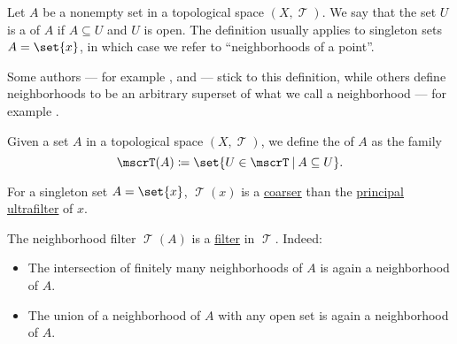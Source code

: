 \begin{definition}\label{def:topological_neighborhood}
  Let \( A \) be a nonempty set in a topological space \( (X, \mscrT) \). We say that the set \( U \) is a  of \( A \) if \( A \subseteq U \) and \( U \) is open. The definition usually applies to singleton sets \( A = \set{ x } \), in which case we refer to \enquote{neighborhoods of a point}.
\end{definition}
\begin{comments}
  \item Some authors --- for example ,  and  --- stick to this definition, while others define neighborhoods to be an arbitrary superset of what we call a neighborhood --- for example .
\end{comments}

\begin{definition}\label{def:neighborhood_filter}
  Given a set \( A \) in a topological space \( (X, \mscrT) \), we define the  of \( A \) as the family
  \begin{equation*}
    \mscrT(A) \coloneqq \set{ U \in \mscrT \given A \subseteq U }.
  \end{equation*}
\end{definition}
\begin{comments}
  \item For a singleton set \( A = \set{ x } \), \( \mscrT(x) \) is a \hyperref[def:filter_ordering]{coarser} than the \hyperref[ex:principal_ultrafilter]{principal ultrafilter} of \( x \).
\end{comments}
\begin{defproof}
  The neighborhood filter \( \mscrT(A) \) is a \hyperref[def:lattice_ideal/ideal]{filter} in \( \mscrT \). Indeed:
  \begin{itemize}
    \item The intersection of finitely many neighborhoods of \( A \) is again a neighborhood of \( A \).
    \item The union of a neighborhood of \( A \) with any open set is again a neighborhood of \( A \).
  \end{itemize}
\end{defproof}

